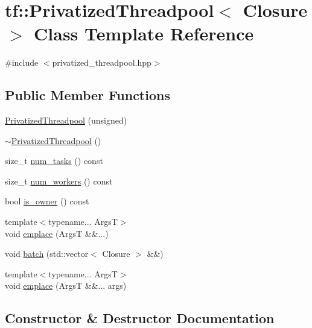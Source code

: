 \hypertarget{classtf_1_1PrivatizedThreadpool}{}\section{tf\+:\+:Privatized\+Threadpool$<$ Closure $>$ Class Template Reference}
\label{classtf_1_1PrivatizedThreadpool}


{\ttfamily \#include $<$privatized\+\_\+threadpool.\+hpp$>$}

\subsection*{Public Member Functions}
\begin{DoxyCompactItemize}
\item 
\hyperlink{classtf_1_1PrivatizedThreadpool_a8c9cdbf54f53999354448890bf8dc7fb}{Privatized\+Threadpool} (unsigned)
\item 
\hyperlink{classtf_1_1PrivatizedThreadpool_a021f35dd73c6b2fb0c8d427509e60cc0}{$\sim$\+Privatized\+Threadpool} ()
\item 
size\+\_\+t \hyperlink{classtf_1_1PrivatizedThreadpool_a9eac224d72e13f08f85cf70ba2ac477e}{num\+\_\+tasks} () const
\item 
size\+\_\+t \hyperlink{classtf_1_1PrivatizedThreadpool_afc5419dbc1bc98f5cd98d3ace43bc137}{num\+\_\+workers} () const
\item 
bool \hyperlink{classtf_1_1PrivatizedThreadpool_a8f523957a144447200128947eb8b7e25}{is\+\_\+owner} () const
\item 
{\footnotesize template$<$typename... ArgsT$>$ }\\void \hyperlink{classtf_1_1PrivatizedThreadpool_a84653d7e8490ec8625fb3d414db45153}{emplace} (ArgsT \&\&...)
\item 
void \hyperlink{classtf_1_1PrivatizedThreadpool_a4505c9609edcd794c99acca1b4a23abc}{batch} (std\+::vector$<$ Closure $>$ \&\&)
\item 
{\footnotesize template$<$typename... ArgsT$>$ }\\void \hyperlink{classtf_1_1PrivatizedThreadpool_a1a8b56c920750c1996c92fcdc6394eac}{emplace} (ArgsT \&\&... args)
\end{DoxyCompactItemize}


\subsection{Constructor \& Destructor Documentation}
\mbox{\label{classtf_1_1PrivatizedThreadpool_a8c9cdbf54f53999354448890bf8dc7fb}} 
